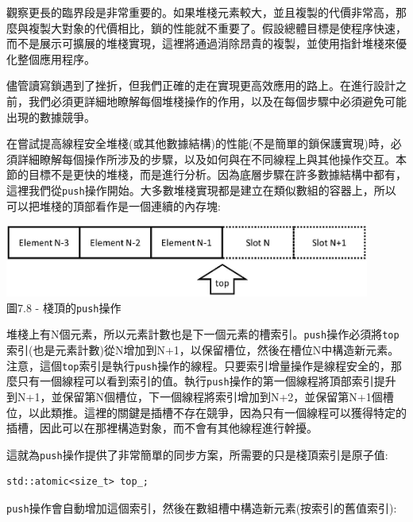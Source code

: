 觀察更長的臨界段是非常重要的。如果堆棧元素較大，並且複製的代價非常高，那麼與複製大對象的代價相比，鎖的性能就不重要了。假設總體目標是使程序快速，而不是展示可擴展的堆棧實現，這裡將通過消除昂貴的複製，並使用指針堆棧來優化整個應用程序。

儘管讀寫鎖遇到了挫折，但我們正確的走在實現更高效應用的路上。在進行設計之前，我們必須更詳細地瞭解每個堆棧操作的作用，以及在每個步驟中必須避免可能出現的數據競爭。


在嘗試提高線程安全堆棧(或其他數據結構)的性能(不是簡單的鎖保護實現)時，必須詳細瞭解每個操作所涉及的步驟，以及如何與在不同線程上與其他操作交互。本節的目標不是更快的堆棧，而是進行分析。因為底層步驟在許多數據結構中都有，這裡我們從\texttt{push}操作開始。大多數堆棧實現都是建立在類似數組的容器上，所以可以把堆棧的頂部看作是一個連續的內存塊:

\begin{center}
\includegraphics[width=0.9\textwidth]{content/2/chapter7/images/8.jpg}\\
圖7.8 - 棧頂的\texttt{push}操作
\end{center}

堆棧上有N個元素，所以元素計數也是下一個元素的槽索引。\texttt{push}操作必須將\texttt{top}索引(也是元素計數)從N增加到N+1，以保留槽位，然後在槽位N中構造新元素。注意，這個\texttt{top}索引是執行\texttt{push}操作的線程。只要索引增量操作是線程安全的，那麼只有一個線程可以看到索引的值。執行\texttt{push}操作的第一個線程將頂部索引提升到N+1，並保留第N個槽位，下一個線程將索引增加到N+2，並保留第N+1個槽位，以此類推。這裡的關鍵是插槽不存在競爭，因為只有一個線程可以獲得特定的插槽，因此可以在那裡構造對象，而不會有其他線程進行幹擾。

這就為\texttt{push}操作提供了非常簡單的同步方案，所需要的只是棧頂索引是原子值:

\begin{lstlisting}[style=styleCXX]
std::atomic<size_t> top_;
\end{lstlisting}

\texttt{push}操作會自動增加這個索引，然後在數組槽中構造新元素(按索引的舊值索引):

